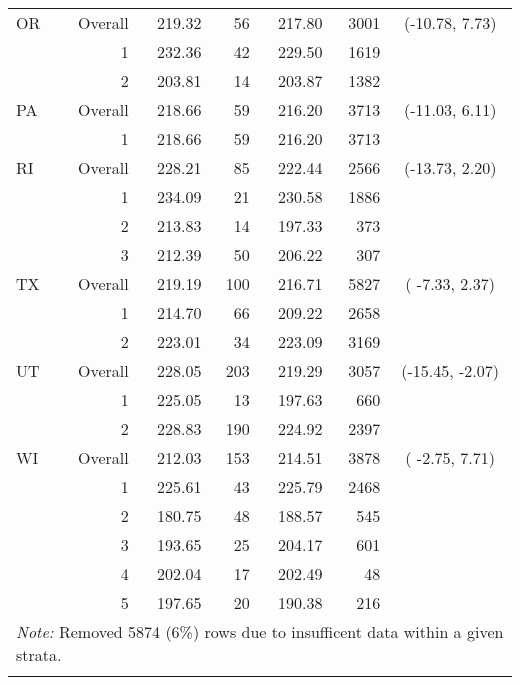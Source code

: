 \begin{longtable}{lrrr@{\extracolsep{.25cm}}rrc}
   \hline
OR & Overall & 219.32 &  56 & 217.80 & 3001 & (-10.78,  7.73) \\ 
   & 1 & 232.36 &  42 & 229.50 & 1619 &  \\ 
   & 2 & 203.81 &  14 & 203.87 & 1382 &  \\ 
   \hline
PA & Overall & 218.66 &  59 & 216.20 & 3713 & (-11.03,  6.11) \\ 
   & 1 & 218.66 &  59 & 216.20 & 3713 &  \\ 
   \hline
RI & Overall & 228.21 &  85 & 222.44 & 2566 & (-13.73,  2.20) \\ 
   & 1 & 234.09 &  21 & 230.58 & 1886 &  \\ 
   & 2 & 213.83 &  14 & 197.33 & 373 &  \\ 
   & 3 & 212.39 &  50 & 206.22 & 307 &  \\ 
   \hline
TX & Overall & 219.19 & 100 & 216.71 & 5827 & ( -7.33,  2.37) \\ 
   & 1 & 214.70 &  66 & 209.22 & 2658 &  \\ 
   & 2 & 223.01 &  34 & 223.09 & 3169 &  \\ 
   \hline
UT & Overall & 228.05 & 203 & 219.29 & 3057 & (-15.45, -2.07) \\ 
   & 1 & 225.05 &  13 & 197.63 & 660 &  \\ 
   & 2 & 228.83 & 190 & 224.92 & 2397 &  \\ 
   \hline
WI & Overall & 212.03 & 153 & 214.51 & 3878 & ( -2.75,  7.71) \\ 
   & 1 & 225.61 &  43 & 225.79 & 2468 &  \\ 
   & 2 & 180.75 &  48 & 188.57 & 545 &  \\ 
   & 3 & 193.65 &  25 & 204.17 & 601 &  \\ 
   & 4 & 202.04 &  17 & 202.49 &  48 &  \\ 
   & 5 & 197.65 &  20 & 190.38 & 216 &  \\ 
   \hline \multicolumn{7}{l}{\textit{Note:} Removed 5874 (6\%) rows due to insufficent data within a given strata.} \\\hline
\label{g4read-mlpsa-ctree}
\end{longtable}
